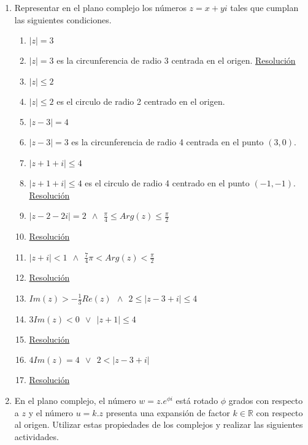\documentclass[a4paper]{article}
\newcommand{\answer}{\item[**]}
\newcommand{\exercise}{\item}
\newcommand{\df}[2]{\displaystyle\frac{#1}{#2}}
\begin{document}
\begin{enumerate}
\begin{multicols}{2}
\begin{enumerate} [label=(\alph*)]
	\end{enumerate}
	\end{multicols}

	\exercise Representar en el plano complejo los números $z=x+yi$ tales que cumplan las siguientes condiciones.
	\begin{multicols}{2}
	\begin{enumerate} [label=(\alph*)]
		
		\item $|z|=3$
		\answer $|z|=3$ es la circunferencia de radio 3 centrada en el origen. \href{https://youtu.be/AQVEp9ncSwQ}{Resolución}

		\item $|z|\leq 2$
		\answer $|z|\leq 2$ es el circulo de radio 2 centrado en el origen.

		\item $|z-3| = 4$
		\answer $|z-3| = 3$ es la circunferencia de radio 4 centrada en el punto $(3,0)$.

		\item $|z+1+i| \leq 4$
		\answer $|z+1+i| \leq 4$ es el circulo de radio 4 centrado en el punto $(-1,-1)$. \href{https://youtu.be/Rj6VfY1fLzw}{Resolución}

		\item $|z-2-2i|=2 ~~\land~~ \df{\pi}{4} \leq Arg(z) \leq \df{\pi}{2}$
		\answer \href{https://youtu.be/5OHpMCsd8iE}{Resolución}

		\item $|z+i|<1 ~~\land~~ \df{7}{4}\pi < Arg(z) < \df{\pi}{2}$
		\answer \href{https://youtu.be/OhXOvWcryMI}{Resolución}
		
		\item $Im(z)> -\df{1}{3}Re(z) ~~\land~~ 2 \leq |z-3+i| \leq 4$

		\item $3Im(z)<0 ~~\lor~~ |z+1| \leq 4$
		\answer \href{https://youtu.be/9pxsYXL6k88}{Resolución}

		\item $4Im(z)=4 ~~\lor~~ 2<|z-3+i|$
		\answer \href{https://youtu.be/3m1ZDSuXsX8}{Resolución}

	\end{enumerate}
	\end{multicols}

	\exercise En el plano complejo, el número $w=z.e^{\phi i}$ está rotado $\phi$ grados con respecto a $z$ y el número $u=k.z$ presenta una expansión de factor $k\in \mathbb{R}$ con respecto al origen. Utilizar estas propiedades de los complejos y realizar las siguientes actividades.
	\begin{enumerate} [label=(\alph*)]


\end{enumerate}
\end{enumerate}
\end{document}

